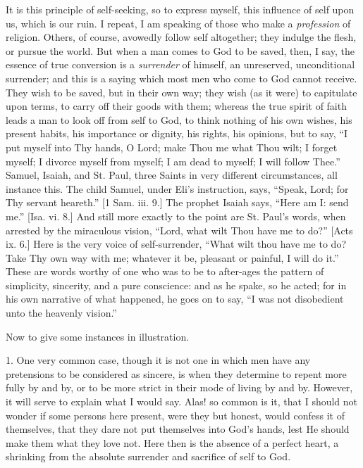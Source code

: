 It is this principle of self-seeking, so to express myself, this
influence of self upon us, which is our ruin. I repeat, I am speaking
of those who make a \emph{profession} of religion. Others, of course,
avowedly follow self altogether; they indulge the flesh, or pursue the
world. But when a man comes to God to be saved, then, I say, the
essence of true conversion is a \emph{surrender} of himself, an
unreserved, unconditional surrender; and this is a saying which most
men who come to God cannot receive. They wish to be saved, but in
their own way; they wish (as it were) to capitulate upon terms, to
carry off their goods with them; whereas the true spirit of faith
leads a man to look off from self to God, to think nothing of his own
wishes, his present habits, his importance or dignity, his rights, his
opinions, but to say, ``I put myself into Thy hands, O Lord; make
Thou me what Thou wilt; I forget myself; I divorce myself from myself;
I am dead to myself; I will follow Thee.'' Samuel, Isaiah, and St.
Paul, three Saints in very different circumstances, all instance this.
The child Samuel, under Eli's instruction, says, ``Speak, Lord;
for Thy servant heareth.'' [1 Sam. iii. 9.] The prophet Isaiah
says, ``Here am I: send me.'' [Isa. vi. 8.] And still more
exactly to the point are St. Paul's words, when arrested by the
miraculous vision, ``Lord, what wilt Thou have me to do?''
[Acts ix. 6.] Here is the very voice of self-surrender, ``What
wilt thou have me to do? Take Thy own way with me; whatever it be,
pleasant or painful, I will do it.'' These are words worthy of one
who was to be to after-ages the pattern of simplicity, sincerity, and
a pure conscience: and as he spake, so he acted; for in his own
narrative of what happened, he goes on to say, ``I was not
disobedient unto the heavenly vision.''

Now to give some instances in illustration.

1. One very common case, though it is not one in which men have any
pretensions to be considered as sincere, is when they determine to
repent more fully by and by, or to be more strict in their mode of
living by and by. However, it will serve to explain what I would say.
Alas! so common is it, that I should not wonder if some persons here
present, were they but honest, would confess it of themselves, that
they dare not put themselves into God's hands, lest He should make
them what they love not. Here then is the absence of a perfect heart,
a shrinking from the absolute surrender and sacrifice of self to God.

